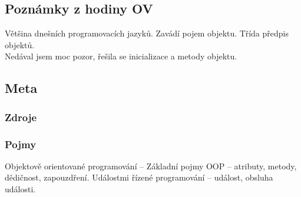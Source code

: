\documentclass[12pt]{article}
\begin{document}
\subsection{Poznámky z hodiny OV}
Většina dnešních programovacích jazyků. Zavádí pojem objektu. Třída předpis objektů.\\
Nedával jsem moc pozor, řešila se inicializace a metody objektu.

\subsection{Meta}
\subsubsection{Zdroje}
\subsubsection{Pojmy}
Objektově orientované programování – Základní pojmy OOP – atributy, metody, dědičnost, zapouzdření. Událostmi řízené programování – událost, obsluha události.
\end{document}
